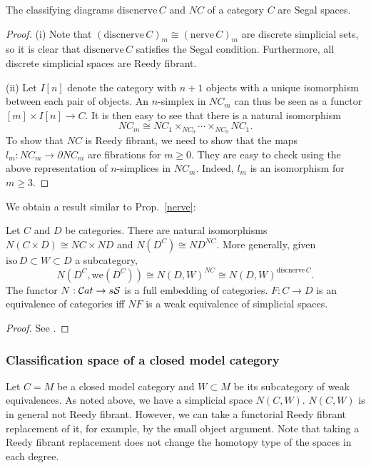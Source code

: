 \begin{prop}
The classifying diagrams $\mathrm{discnerve}\,C$ and $NC$ of a category $C$ are Segal spaces.
\end{prop}
\begin{proof}
(i) Note that $(\mathrm{discnerve}\,C)_m\cong(\mathrm{nerve}\,C)_m$ are discrete simplicial sets, so it is clear that $\mathrm{discnerve}\,C$ satisfies the Segal condition. Furthermore, all discrete simplicial spaces are Reedy fibrant.

(ii) Let $I[n]$ denote the category with $n+1$ objects with a unique isomorphism between each pair of objects. An $n$-simplex in $NC_m$ can thus be seen as a functor $[m]\times I[n]\to C$. It is then easy to see that there is a natural isomorphism
$$NC_m\cong NC_1\times_{NC_0}\cdots\times_{NC_0}NC_1.$$
To show that $NC$ is Reedy fibrant, we need to show that the maps $l_m:NC_m\to\partial NC_m$ are fibrations for $m\ge0$. They are easy to check using the above representation of $n$-simplices in $NC_m$. Indeed, $l_m$ is an isomorphism for $m\ge 3$.
\end{proof}

We obtain a result similar to Prop.~\ref{nerve}:
\begin{prop}\label{nerveprop}
Let $C$ and $D$ be categories. There are natural isomorphisms $N(C\times D)\cong NC\times ND$ and $N(D^C)\cong ND^{NC}$. More generally, given $\mathrm{iso}\,D\subset W\subset D$ a subcategory,
\begin{equation} \label{nfuncat}
N(D^C,\mathrm{we}(D^C))\cong N(D,W)^{NC}\cong N(D,W)^{\mathrm{discnerve}\,C}.
\end{equation}
The functor $N:{\cal C}at\to s\mathcal S$ is a full embedding of categories. $F:C\to D$ is an equivalence of categories iff $NF$ is a weak equivalence of simplicial spaces.
\end{prop}
\begin{proof}
See \cite[Thm 3.7, Prop 3.11]{rezk}.
\end{proof}

\subsubsection{Classification space of a closed model category}
Let $C=M$ be a closed model category and $W\subset M$ be its subcategory of weak equivalences. As noted above, we have a simplicial space $N(C,W)$. $N(C,W)$ is in general not Reedy fibrant. However, we can take a functorial Reedy fibrant replacement of it, for example, by the small object argument. Note that taking a Reedy fibrant replacement does not change the homotopy type of the spaces in each degree.

